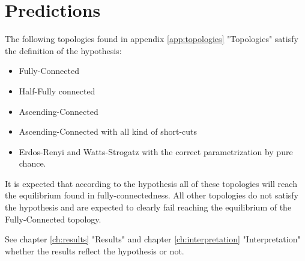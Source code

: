 \documentclass[Bachelorarbeit.tex]{subfiles}
\begin{document}
\section{Predictions}
The following topologies found in appendix \ref{app:topologies} "Topologies" satisfy the definition of the hypothesis:
 
\begin{itemize}
\item Fully-Connected
\item Half-Fully connected
\item Ascending-Connected
\item Ascending-Connected with all kind of short-cuts
\item Erdos-Renyi and Watts-Strogatz with the correct parametrization by pure chance.
\end{itemize}

It is expected that according to the hypothesis all of these topologies will reach the equilibrium found in fully-connectedness. All other topologies do not satisfy the hypothesis and are expected to clearly fail reaching the equilibrium of the Fully-Connected topology.

\medskip

See chapter \ref{ch:results} "Results" and chapter \ref{ch:interpretation} "Interpretation" whether the results reflect the hypothesis or not. 
\end{document}

